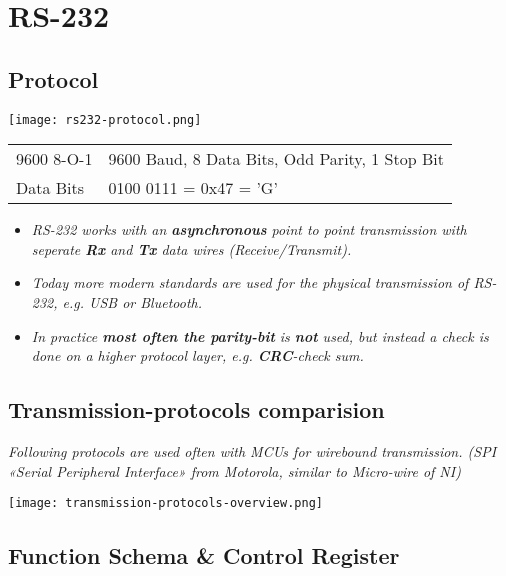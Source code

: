 \section{RS-232}

\subsection{Protocol}

\texttt{[image: rs232-protocol.png]}

\begin{tabular}{lp{}}
    9600 8-O-1 & 9600 Baud, 8 Data Bits, Odd Parity, 1 Stop Bit \\
    Data Bits & 0100 0111 = 0x47 = 'G' \\
\end{tabular}

\begin{itemize}
    \item{
        \textit{
            RS-232 works with an \textbf{asynchronous} point to point transmission with
            seperate \textbf{Rx} and \textbf{Tx} data wires (Receive/Transmit).
        }
    }
    \item{
        \textit{
            Today more modern standards are used for the physical transmission
            of RS-232, e.g. USB or Bluetooth.
        }
    }
    \item{
        \textit{
            In practice \textbf{most often the parity-bit} is \textbf{not} used, but instead a check
            is done on a higher protocol layer, e.g. \textbf{CRC}-check sum.
        }
    }
\end{itemize}

\subsection{Transmission-protocols comparision}

\textit{
    Following protocols are used often with MCUs for wirebound transmission.
    (SPI «Serial Peripheral Interface» from Motorola, similar to Micro-wire of NI)
}

\texttt{[image: transmission-protocols-overview.png]}

\subsection{Function Schema \& Control Register}

